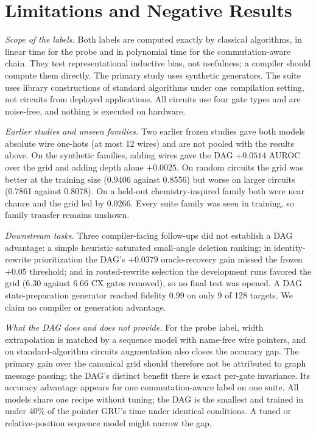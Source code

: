\documentclass[conference,a4paper]{IEEEtran}
\begin{document}
\section{Limitations and Negative Results}\label{sec:limits}

\emph{Scope of the labels.} Both labels are computed exactly by classical algorithms, in linear time for the probe and in polynomial time for the commutation-aware chain. They test representational inductive bias, not usefulness; a compiler should compute them directly. The primary study uses synthetic generators. The suite uses library constructions of standard algorithms under one compilation setting, not circuits from deployed applications. All circuits use four gate types and are noise-free, and nothing is executed on hardware.

\emph{Earlier studies and unseen families.} Two earlier frozen studies gave both models absolute wire one-hots (at most 12 wires) and are not pooled with the results above. On the synthetic families, adding wires gave the DAG $+0.0514$ AUROC over the grid and adding depth alone $+0.0025$. On random circuits the grid was better at the training size (0.9406 against 0.8556) but worse on larger circuits (0.7861 against 0.8078). On a held-out chemistry-inspired family both were near chance and the grid led by $0.0266$. Every suite family was seen in training, so family transfer remains unshown.

\emph{Downstream tasks.} Three compiler-facing follow-ups did not establish a DAG advantage: a simple heuristic saturated small-angle deletion ranking; in identity-rewrite prioritization the DAG's $+0.0379$ oracle-recovery gain missed the frozen $+0.05$ threshold; and in routed-rewrite selection the development runs favored the grid (6.30 against 6.66 CX gates removed), so no final test was opened. A DAG state-preparation generator reached fidelity 0.99 on only 9 of 128 targets. We claim no compiler or generation advantage.

\emph{What the DAG does and does not provide.} For the probe label, width extrapolation is matched by a sequence model with name-free wire pointers, and on standard-algorithm circuits augmentation also closes the accuracy gap. The primary gain over the canonical grid should therefore not be attributed to graph message passing; the DAG's distinct benefit there is exact per-gate invariance. Its accuracy advantage appears for one commutation-aware label on one suite. All models share one recipe without tuning; the DAG is the smallest and trained in under 40\% of the pointer GRU's time under identical conditions. A tuned or relative-position sequence model might narrow the gap.
\end{document}
